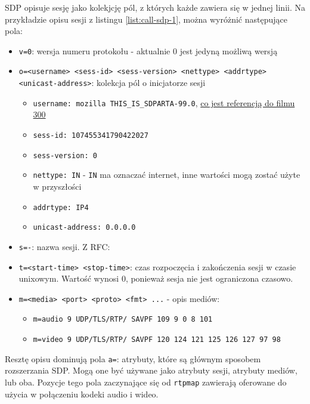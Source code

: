 \cite{rfc8866} SDP opisuje sesję jako kolekjcję pól, z których każde zawiera się w jednej linii. Na przykładzie opisu
sesji z listingu \ref{list:call-sdp-1}, można wyróżnić następujące pola:

\begin{itemize}
  \item \verb|v=0|: wersja numeru protokołu - aktualnie 0 jest jedyną możliwą wersją
  \item \verb|o=<username> <sess-id> <sess-version> <nettype> <addrtype> <unicast-address>|: kolekcja pól o inicjatorze
        sesji
        \begin{itemize}
          \item \verb|username: mozilla THIS_IS_SDPARTA-99.0|, \href{https://stackoverflow.com/a/52583935}{co jest referencją do filmu 300}
          \item \verb|sess-id: 107455341790422027|
          \item \verb|sess-version: 0|
          \item \verb|nettype: IN| - \verb|IN| ma oznaczać internet, inne wartości mogą zostać użyte w przyszłości
          \item \verb|addrtype: IP4|
          \item \verb|unicast-address: 0.0.0.0|
        \end{itemize}
  \item \verb|s=-|: nazwa sesji. Z RFC: \cite{rfc8866}
  \item \verb|t=<start-time> <stop-time>|: czas rozpoczęcia i zakończenia sesji w czasie unixowym. Wartość wynosi 0,
        ponieważ sesja nie jest ograniczona czasowo.
  \item \verb|m=<media> <port> <proto> <fmt> ...| - opis mediów:
        \begin{itemize}
          \item \verb|m=audio 9 UDP/TLS/RTP/ SAVPF 109 9 0 8 101|
          \item \verb|m=video 9 UDP/TLS/RTP/ SAVPF 120 124 121 125 126 127 97 98|
        \end{itemize}
\end{itemize}

Resztę opisu dominują pola \verb|a=|: atrybuty, które są głównym sposobem rozszerzania SDP. Mogą one być używane jako
atrybuty sesji, atrybuty mediów, lub oba. Pozycje tego pola zaczynające się od \verb|rtpmap| zawierają oferowane do
użycia w połączeniu kodeki audio i wideo.
